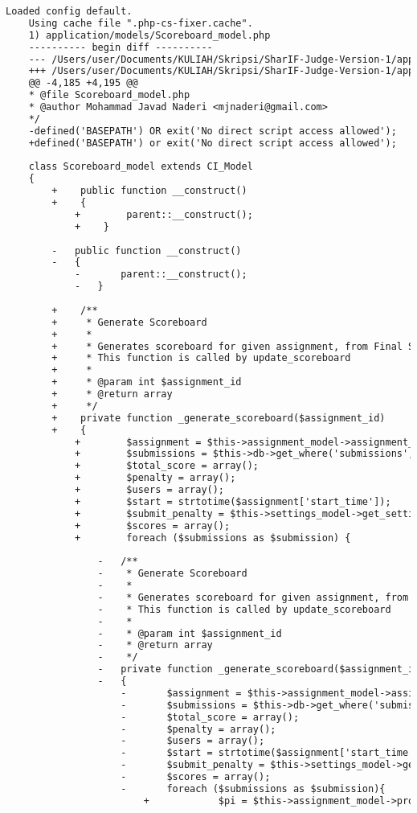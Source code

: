 \begin{lstlisting}[language=diff, caption=Perubahan pada kode Scoreboard\_model.php]
	Loaded config default.
	Using cache file ".php-cs-fixer.cache".
	1) application/models/Scoreboard_model.php
	---------- begin diff ----------
	--- /Users/user/Documents/KULIAH/Skripsi/SharIF-Judge-Version-1/application/models/Scoreboard_model.php
	+++ /Users/user/Documents/KULIAH/Skripsi/SharIF-Judge-Version-1/application/models/Scoreboard_model.php
	@@ -4,185 +4,195 @@
	* @file Scoreboard_model.php
	* @author Mohammad Javad Naderi <mjnaderi@gmail.com>
	*/
	-defined('BASEPATH') OR exit('No direct script access allowed');
	+defined('BASEPATH') or exit('No direct script access allowed');
	
	class Scoreboard_model extends CI_Model
	{
		+    public function __construct()
		+    {
			+        parent::__construct();
			+    }
		
		-	public function __construct()
		-	{
			-		parent::__construct();
			-	}
		
		+    /**
		+     * Generate Scoreboard
		+     *
		+     * Generates scoreboard for given assignment, from Final Submissions.
		+     * This function is called by update_scoreboard
		+     *
		+     * @param int $assignment_id
		+     * @return array
		+     */
		+    private function _generate_scoreboard($assignment_id)
		+    {
			+        $assignment = $this->assignment_model->assignment_info($assignment_id);
			+        $submissions = $this->db->get_where('submissions', array('is_final' => 1 , 'assignment' => $assignment_id))->result_array();
			+        $total_score = array();
			+        $penalty = array();
			+        $users = array();
			+        $start = strtotime($assignment['start_time']);
			+        $submit_penalty = $this->settings_model->get_setting('submit_penalty');
			+        $scores = array();
			+        foreach ($submissions as $submission) {
				
				-	/**
				-	 * Generate Scoreboard
				-	 *
				-	 * Generates scoreboard for given assignment, from Final Submissions.
				-	 * This function is called by update_scoreboard
				-	 *
				-	 * @param int $assignment_id
				-	 * @return array
				-	 */
				-	private function _generate_scoreboard($assignment_id)
				-	{
					-		$assignment = $this->assignment_model->assignment_info($assignment_id);
					-		$submissions = $this->db->get_where('submissions', array('is_final' => 1 , 'assignment' => $assignment_id))->result_array();
					-		$total_score = array();
					-		$penalty = array();
					-		$users = array();
					-		$start = strtotime($assignment['start_time']);
					-		$submit_penalty = $this->settings_model->get_setting('submit_penalty');
					-		$scores = array();
					-		foreach ($submissions as $submission){
						+            $pi = $this->assignment_model->problem_info($assignment_id, $submission['problem']);
						

\end{lstlisting}
